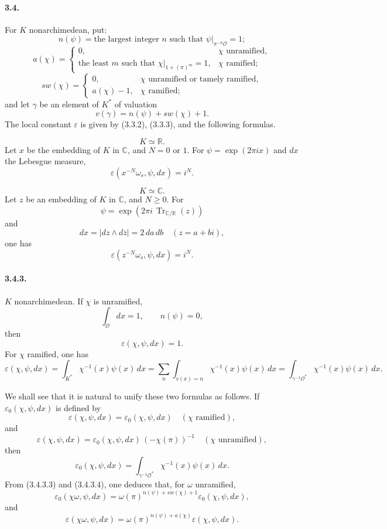 \documentclass[10pt,letterpaper]{article}
\newcommand{\C}{\mathbb C}
\newcommand{\Tr}{\operatorname{Tr}}
\providecommand{\R}{\mathbb R}
\providecommand{\Tr}{\operatorname{Tr}}
\providecommand{\Tr}{\operatorname{Tr}}
\providecommand{\Tr}{\operatorname{Tr}}
\begin{document}
\paragraph{3.4.} For \(K\) nonarchimedean, put:
\[
n(\psi)=\text{the largest integer }n\text{ such that }\psi|_{\pi^{-n}\mathcal O}=1;
\]
\[
a(\chi)=
\begin{cases}
0,&\chi\text{ unramified},\\
\text{the least }m\text{ such that }\chi|_{1+(\pi)^m}=1,&\chi\text{ ramified};
\end{cases}
\]
\[
sw(\chi)=
\begin{cases}
0,&\chi\text{ unramified or tamely ramified},\\
a(\chi)-1,&\chi\text{ ramified};
\end{cases}
\]
and let \(\gamma\) be an element of \(K^*\) of valuation
\[
v(\gamma)=n(\psi)+sw(\chi)+1.
\]
The local constant \(\varepsilon\) is given by (3.3.2), (3.3.3), and the following formulas.

\[
\tag{3.4.1}
K\simeq\R.
\]
Let \(x\) be the embedding of \(K\) in \(\C\), and \(N=0\) or \(1\). For \(\psi=\exp(2\pi ix)\) and \(dx\) the Lebesgue measure,
\[
\varepsilon(x^{-N}\omega_s,\psi,dx)=i^N.
\]

\[
\tag{3.4.2}
K\simeq\C.
\]
Let \(z\) be an embedding of \(K\) in \(\C\), and \(N\ge0\). For
\[
\psi=\exp(2\pi i\,\Tr_{\C/\R}(z))
\]
and
\[
dx=|dz\wedge d\overline z|=2\,da\,db\quad(z=a+bi),
\]
one has
\[
\varepsilon(z^{-N}\omega_s,\psi,dx)=i^N.
\]

\paragraph{3.4.3.} \(K\) nonarchimedean. If \(\chi\) is unramified,
\[
\int_{\mathcal O}dx=1,\qquad n(\psi)=0,
\]
then
\[
\tag{3.4.3.1}
\varepsilon(\chi,\psi,dx)=1.
\]
For \(\chi\) ramified, one has
\[
\tag{3.4.3.2}
\varepsilon(\chi,\psi,dx)=
\int_{K^*}\chi^{-1}(x)\psi(x)\,dx
=
\sum_n\int_{v(x)=n}\chi^{-1}(x)\psi(x)\,dx
=
\int_{\gamma^{-1}\mathcal O^*}\chi^{-1}(x)\psi(x)\,dx.
\]

We shall see that it is natural to unify these two formulas as follows. If \(\varepsilon_0(\chi,\psi,dx)\) is defined by
\[
\varepsilon(\chi,\psi,dx)=\varepsilon_0(\chi,\psi,dx)
\quad(\chi\text{ ramified}),
\]
and
\[
\tag{3.4.3.3}
\varepsilon(\chi,\psi,dx)=\varepsilon_0(\chi,\psi,dx)\,(-\chi(\pi))^{-1}
\quad(\chi\text{ unramified}),
\]
then
\[
\tag{3.4.3.4}
\varepsilon_0(\chi,\psi,dx)=
\int_{\gamma^{-1}\mathcal O^*}\chi^{-1}(x)\psi(x)\,dx.
\]
From (3.4.3.3) and (3.4.3.4), one deduces that, for \(\omega\) unramified,
\[
\tag{3.4.3.5}
\varepsilon_0(\chi\omega,\psi,dx)
=
\omega(\pi)^{n(\psi)+sw(\chi)+1}\varepsilon_0(\chi,\psi,dx),
\]
and
\[
\varepsilon(\chi\omega,\psi,dx)
=
\omega(\pi)^{n(\psi)+a(\chi)}\varepsilon(\chi,\psi,dx).
\]
\end{document}
